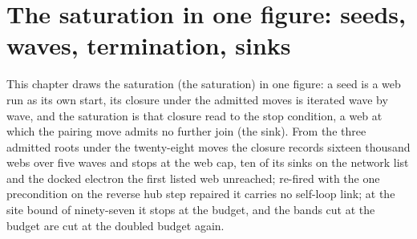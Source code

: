 \section{The saturation in one figure: seeds, waves, termination, sinks}\label{mod:I-5-saturation-in-one-figure-seeds-waves-termination-sinks}
\begin{chwall}\label{box:I-5-saturation-in-one-figure-seeds-waves-termination-sinks:1}
This chapter draws the saturation (the saturation) in one figure: a seed is a web run as its own start, its closure under the admitted moves is iterated wave by wave, and the saturation is that closure read to the stop condition, a web at which the pairing move admits no further join (the sink). From the three admitted roots under the twenty-eight moves the closure records sixteen thousand webs over five waves and stops at the web cap, ten of its sinks on the network list and the docked electron the first listed web unreached; re-fired with the one precondition on the reverse hub step repaired it carries no self-loop link; at the site bound of ninety-seven it stops at the budget, and the bands cut at the budget are cut at the doubled budget again.
\end{chwall}
